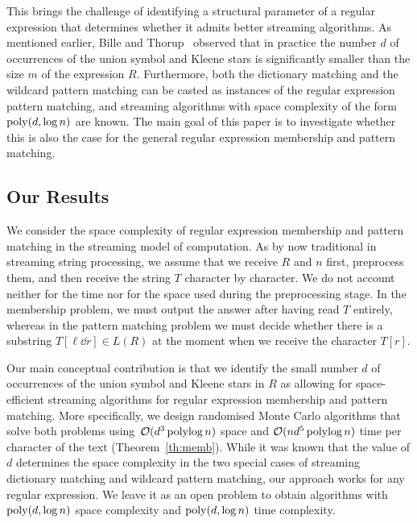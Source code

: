 This brings the challenge of identifying a structural parameter of a regular expression that determines whether it admits better
streaming algorithms.
As mentioned earlier, Bille and Thorup~\cite{doi:10.1137/1.9781611973075.104} observed that in practice  
the number $d$ of occurrences of the union symbol and Kleene stars is significantly smaller than the size $m$ of the expression $R$.
Furthermore, both the dictionary matching and the wildcard pattern matching can be casted
as instances of the regular expression pattern matching, and streaming algorithms with space complexity of the form~$\mathrm{poly}(d,\log n)$
are known. The main goal of this paper is to investigate whether this is also the case for the general
regular expression membership and pattern matching.

\subsection{Our Results}
We consider the space complexity of regular expression membership and pattern matching in the streaming model of
computation. 
As by now traditional in streaming string processing, we assume that we receive $R$ and $n$ first, preprocess them, and then receive the string $T$ character by character. We do not account neither for the time nor for the space used during the preprocessing stage.
In the membership problem, we must output the answer after having read $T$ entirely, whereas in the pattern matching problem we must decide whether there is a substring $T[\ell \dd r] \in L(R)$ at the moment when we receive the character $T[r]$. 

Our main conceptual contribution is that we identify the small number $d$ of occurrences of the union symbol and Kleene stars
in $R$ as allowing for space-efficient streaming algorithms for regular expression membership and pattern matching.
More specifically, we design randomised Monte Carlo algorithms that solve both problems
using~$\mathcal{O}(d^3\operatorname{polylog} n)$ space and $\mathcal{O}(nd^5\operatorname{polylog} n)$ time per character of the text (Theorem~\ref{th:memb}).
While it was known that the value of $d$ determines the space complexity in the two special cases of
streaming dictionary matching and wildcard pattern matching, our approach works for any regular expression.
We leave it as an open problem to obtain algorithms with $\mathrm{poly}(d, \log n)$ space complexity and $\mathrm{poly}(d, \log n)$ time complexity. 

